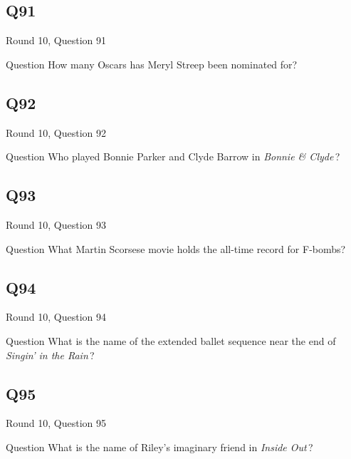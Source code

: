 \documentclass[11pt]{beamer}
\begin{document}
\subsection*{Q91}
\begin{frame}[t]{Round 10, Question 91}
  \vspace{2em}
  \begin{block}{Question}
    How many Oscars has Meryl Streep been nominated for?
  \end{block}
\end{frame}


\subsection*{Q92}
\begin{frame}[t]{Round 10, Question 92}
  \vspace{2em}
  \begin{block}{Question}
    Who played Bonnie Parker and Clyde Barrow in \emph{Bonnie \& Clyde}\,?
  \end{block}
\end{frame}


\subsection*{Q93}
\begin{frame}[t]{Round 10, Question 93}
  \vspace{2em}
  \begin{block}{Question}
    What Martin Scorsese movie holds the all-time record for F-bombs?
  \end{block}
\end{frame}


\subsection*{Q94}
\begin{frame}[t]{Round 10, Question 94}
  \vspace{2em}
  \begin{block}{Question}
    What is the name of the extended ballet sequence near the end of \emph{Singin' in the Rain}\,?
  \end{block}
\end{frame}


\subsection*{Q95}
\begin{frame}[t]{Round 10, Question 95}
  \vspace{2em}
  \begin{block}{Question}
    What is the name of Riley's imaginary friend in \emph{Inside Out}\,?
  \end{block}
\end{frame}
\end{document}
